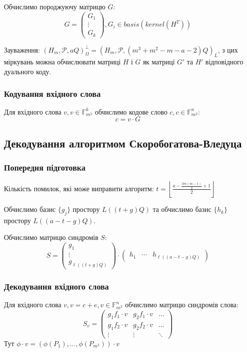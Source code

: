 \documentclass[a4paper,12pt,oneside]{article}
\begin{document}
Обчислимо породжуючу матрицю $G$:
$$
G =
\begin{pmatrix}
    G_1 \\
    \vdots \\
    G_k
\end{pmatrix}, G_i \in basis(kernel(H^T))
$$

Зауваження: $(H_m, \mathcal{P}, aQ)_\Omega^\perp = (H_m, \mathcal{P}, (m^3+m^2-m-a-2)Q)_L$, з цих міркувань можна обчислювати матриці $H$ і $G$ як матриці 
$G'$ та $H'$ відповідного дуального коду.

\subsubsection{Кодування вхідного слова}
Для вхідного слова $v, v\in \mathbb{F}_{m^2}^k$ обчислимо кодове слово $c, c \in \mathbb{F}_{m^2}^n$:
$$c = v \cdot G$$

\subsection{Декодування алгоритмом Скоробогатова-Вледуца}
\subsubsection{Попередня підготовка}
Кількість помилок, які може виправити алгоритм: $t = \left \lfloor \frac{a-\frac{3m(m-1)}{2} + 1}{2} \right \rfloor$

Обчислимо базис $\{g_j\}$ простору $L( (t+g)Q )$ та обчислимо базис $\{h_k\}$ простору $L( (a-t-g)Q)$.

Обчислимо матрицю синдромів $S$:
$$
S = 
\begin{pmatrix}
    g_1 \\
    \vdots \\
    g_{\ell( (t+g)Q )}
\end{pmatrix}
\cdot
\begin{pmatrix}
    h_1 & \cdots & h_{\ell( (a-t-g)Q)}
\end{pmatrix}
$$

\subsubsection{Декодування вхідного слова}
Для вхідного слова $v, v=c+e, v \in \mathbb{F}_{m^2}^n$ обчислимо матрицю синдромів слова:
$$
S_v = 
\begin{pmatrix}
    g_1 f_1 \cdot v & g_2 f_1 \cdot v & \dots \\
    g_1 f_2 \cdot v & g_2 f_2 \cdot v & \dots \\
    \vdots & \vdots & \ddots
\end{pmatrix}
$$
Тут $\phi \cdot v = (\phi(P_1), \dots , \phi(P_{m^3})) \cdot v$
\end{document}
